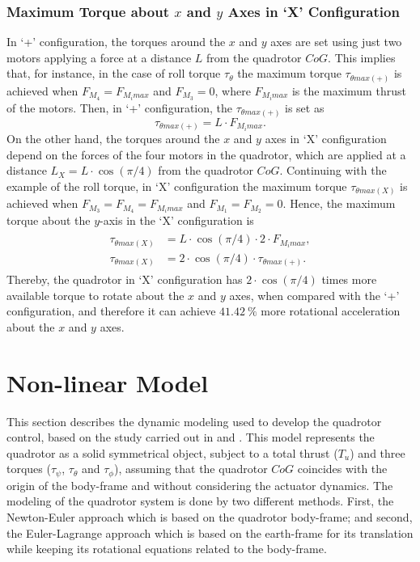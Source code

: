 \subsubsection{Maximum Torque about $x$ and $y$ Axes in `X' Configuration}
In `+' configuration, the torques around the $x$ and $y$ axes are set using just two motors applying a force at a distance $L$ from the quadrotor $CoG$. This implies that, for instance, in the case of roll torque $\tau_\theta$ the maximum torque $\tau_{\theta max (+)}$ is achieved when $F_{M_4} = F_{M_i max}$ and $F_{M_3} = 0$, where $F_{M_i max}$ is the maximum thrust of the motors. Then, in `+' configuration, the $\tau_{\theta max (+)}$ is set as
\begin{equation}
\tau_{\theta max (+)} = L\cdot F_{M_i max}.
\end{equation}
On the other hand, the torques around the $x$ and $y$ axes in `X' configuration depend on the forces of the four motors in the quadrotor, which are applied at a distance $L_{X} = L\cdot \cos(\pi/4)$ from the quadrotor $CoG$. Continuing with the example of the roll torque, in `X' configuration the maximum torque $\tau_{\theta max (X)}$ is achieved when $F_{M_3} = F_{M_4} = F_{M_i max}$ and $F_{M_1} = F_{M_2} = 0$. Hence, the maximum torque about the $y$-axis in the `X' configuration is
\begin{align}
\begin{split}
\tau_{\theta max (X)} & = L\cdot \cos(\pi/4) \cdot 2 \cdot F_{M_i max},\\[5px]
\tau_{\theta max (X)} & = 2\cdot \cos(\pi/4) \cdot \tau_{\theta max (+)}.
\end{split}
\end{align}
Thereby, the quadrotor in `X' configuration has $2\cdot \cos(\pi/4)$ times more available torque to rotate about the $x$ and $y$ axes, when compared with the `+' configuration, and therefore it can achieve $41.42\ \%$ more rotational acceleration about the $x$ and $y$ axes.


\section{Non-linear Model}
\label{sec:nonlinear}

This section describes the dynamic modeling used to develop the quadrotor control, based on the study carried out in \cite{Bouabdallah2007} and \cite{Bresciani2008}. This model represents the quadrotor as a solid symmetrical object, subject to a total thrust ($T_u$) and three torques ($\tau_\psi$, $\tau_\theta$ and $\tau_\phi$), assuming that the quadrotor $CoG$ coincides with the origin of the body-frame and without considering the actuator dynamics. The modeling of the quadrotor system is done by two different methods. First, the Newton-Euler approach which is based on the quadrotor body-frame; and second, the Euler-Lagrange approach which is based on the earth-frame for its translation while keeping its rotational equations related to the body-frame.

